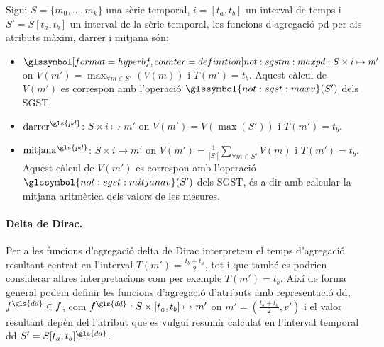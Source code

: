 \begin{definition}
  \label{def:sgstm:maxpd}
  Sigui $S=\{m_0,\dotsc,m_k\}$ una sèrie temporal, $i=[t_a,t_b]$ un
  interval de temps i $S'=S[t_a,t_b]$ un interval de la sèrie
  temporal, les funcions d'agregació \gls{pd} per als atributs màxim,
  darrer i mitjana són:
  \begin{itemize}

  \item $\glssymboldef{not:sgstm:maxpd}: S \times i \mapsto
    m'$ on $V(m') = \max_{\forall m \in S'}(V(m))$ i
    $T(m')=t_b$. Aquest càlcul de $V(m')$ es correspon amb l'operació
    $\glssymbol{not:sgst:maxv}(S')$ dels \gls{SGST}.

\item $\operatorname{darrer}^{\gls{pd}}$: $S \times i \mapsto m'$ on $V(m') =
  V(\max(S'))$ i $T(m')=t_b$.

\item $\operatorname{mitjana}^{\gls{pd}}$: $S \times i \mapsto m'$ on $V(m') =
  \frac{1}{|S'|} \sum\limits_{\forall m\in S'} V(m)$ i $T(m')=t_b$. Aquest càlcul de
  $V(m')$ es correspon amb l'operació $\glssymbol{not:sgst:mitjanav}(S')$
  dels \gls{SGST}, és a dir amb calcular la mitjana aritmètica dels
  valors de les mesures.
\end{itemize}

\end{definition}



\paragraph{Delta de Dirac.} 
Per a les funcions d'agregació delta de Dirac interpretem el temps
d'agregació resultant centrat en l'interval $T(m')=\frac{t_b+t_a}{2}$,
tot i que també es podrien considerar altres interpretacions com per
exemple $T(m')=t_b$. Així de forma general podem definir les funcions
d'agregació d'atributs amb representació \gls{dd}, $f^{\gls{dd}}\in
f$, com $f^{\gls{dd}}: S \times [t_a,t_b] \mapsto m'$ on
$m'=(\frac{t_b+t_a}{2},v')$ i el valor resultant depèn del l'atribut
que es vulgui resumir calculat en l'interval temporal \gls{dd}
$S'=S[t_a,t_b]^{\gls{dd}}$.


